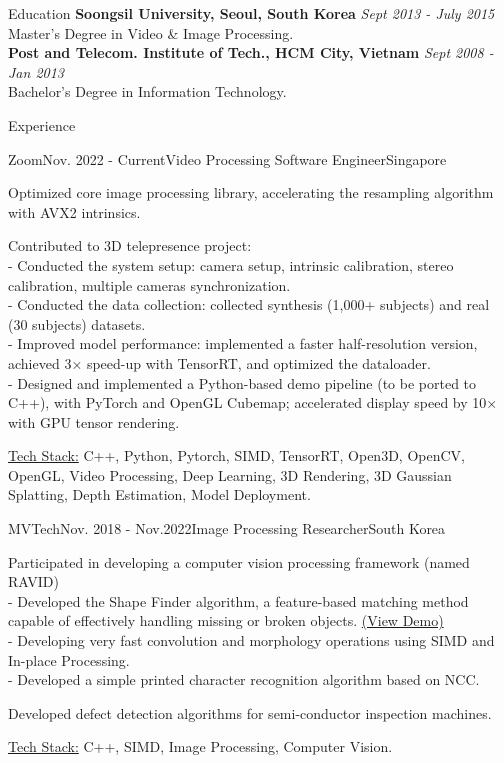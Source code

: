 \documentclass{resume}
\begin{document}
	\begin{rSection}{Education}
		{\bf Soongsil University, Seoul, South Korea} \hfill {\em Sept 2013 - July 2015} \\  {Master's Degree in Video \& Image Processing.} \smallskip \\
		{\bf Post and Telecom. Institute of Tech., HCM City, Vietnam} \hfill {\em Sept 2008 - Jan 2013} \\  {Bachelor's Degree in Information Technology.}
	\end{rSection}

	\begin{rSection}{Experience}
		\begin{rSubsection}{Zoom}{Nov. 2022 - Current}{Video Processing Software  Engineer}{Singapore}
			\item Optimized core image processing library, accelerating the resampling algorithm with AVX2 intrinsics.
			\item Contributed to 3D telepresence project:\\
			- Conducted the system setup: camera setup,  intrinsic calibration, stereo calibration, multiple cameras synchronization.\\
			- Conducted the data collection: collected synthesis (1,000+ subjects) and real (30 subjects) datasets.\\
			- Improved model performance: implemented a faster half-resolution version, achieved 3× speed-up with TensorRT, and optimized the dataloader.\\
			- Designed and implemented a Python-based demo pipeline (to be ported to C++), with PyTorch and OpenGL Cubemap; accelerated display speed by 10× with GPU tensor rendering.
			\item \underline{Tech Stack:} C++, Python, Pytorch, SIMD, TensorRT, Open3D, OpenCV, OpenGL, Video Processing, Deep Learning, 3D Rendering, 3D Gaussian Splatting,  Depth Estimation,  Model Deployment.

		\end{rSubsection}

		\begin{rSubsection}{MVTech}{Nov. 2018 - Nov.2022}{Image Processing Researcher}{South Korea}
			\item Participated in developing a computer vision processing framework (named RAVID) \\
			- Developed the Shape Finder algorithm, a feature-based matching method capable of effectively handling missing or broken objects. \href{https://blog.naver.com/mvtech_ravid/222119961697}{(View Demo)}\\ 			
- Developing very fast convolution and morphology operations using SIMD and In-place Processing. \\
			- Developed a simple printed character recognition algorithm based on NCC.	
			\item Developed defect detection algorithms for semi-conductor inspection machines.
			\item \underline{Tech Stack:} C++, SIMD, Image Processing, Computer Vision.


\end{rSubsection}
\end{rSection}
\end{document}
